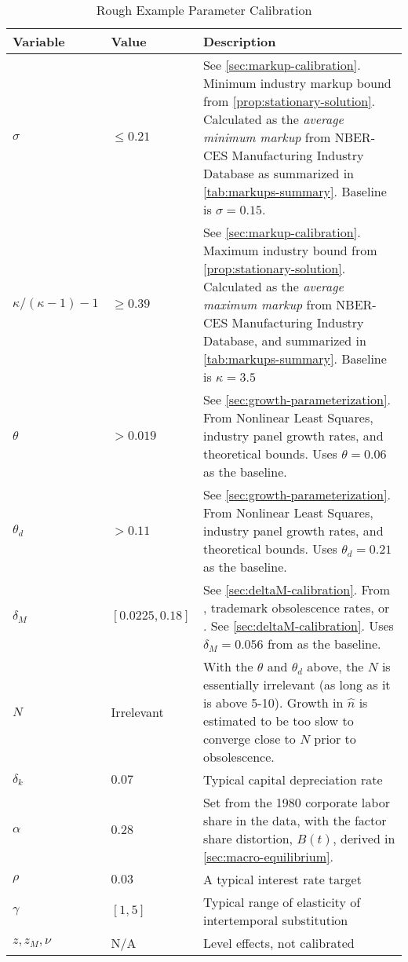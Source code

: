 \documentclass[12pt]{article}
\begin{document}
\begin{table}[ht]
	\centering
	\begin{tabularx}{1.1 \linewidth}{l | l | X}
	\hline\hline
Variable & Value & Description\\
\hline
$\sigma$ & $\leq 0.21$ & See \cref{sec:markup-calibration}.  Minimum industry markup bound from \cref{prop:stationary-solution}. Calculated as the \textit{average minimum markup} from NBER-CES Manufacturing Industry Database as summarized in \cref{tab:markups-summary}.  Baseline is $\sigma = 0.15$.\\ %
$\kappa/(\kappa - 1) - 1$ & $\geq 0.39$   &See \cref{sec:markup-calibration}.  Maximum industry bound from \cref{prop:stationary-solution}.  Calculated as the \textit{average maximum markup} from NBER-CES Manufacturing Industry Database, and summarized in \cref{tab:markups-summary}.  Baseline is $\kappa = 3.5$\\
$\theta$ & $> 0.019$ & See \cref{sec:growth-parameterization}.  From Nonlinear Least Squares, industry panel growth rates, and theoretical bounds. Uses $\theta = 0.06$ as the baseline.\\
$\theta_d$ & $>0.11$& See \cref{sec:growth-parameterization}.  From Nonlinear Least Squares, industry panel growth rates, and theoretical bounds.  Uses $\theta_d = 0.21$ as the baseline.\\
$\delta_M$ & $[0.0225,0.18]$ &See \cref{sec:deltaM-calibration}. From \cite{BrodaWeinstein2010}, trademark obsolescence rates, or \cite{AtkesonBurstein2015}.  See \cref{sec:deltaM-calibration}.  Uses $\delta_M = 0.056$ from \cite{BrodaWeinstein2010} as the baseline.\\
$N$ & Irrelevant & With the $\theta$ and $\theta_d$ above, the $N$ is essentially irrelevant (as long as it is above 5-10).  Growth in $\hat{n}$ is estimated to be too slow to converge close to $N$ prior to obsolescence.\\
$\delta_k$ &$ 0.07$ & Typical capital depreciation rate\\
$\alpha$ & $0.28$ & Set from the 1980 corporate labor share in the data, with the factor share distortion, $B(t)$, derived in \cref{sec:macro-equilibrium}.\footnotemark\\
$\rho$ & $0.03$ & A typical interest rate target\\
$\gamma$ & $[1, 5]$ & Typical range of elasticity of intertemporal substitution\\
$z, z_M, \nu$ & N/A & Level effects, not calibrated\\
\hline\end{tabularx}
	\caption{Rough Example Parameter Calibration}
	\label{tab:parameter-calibration}
\end{table}
\end{document}
